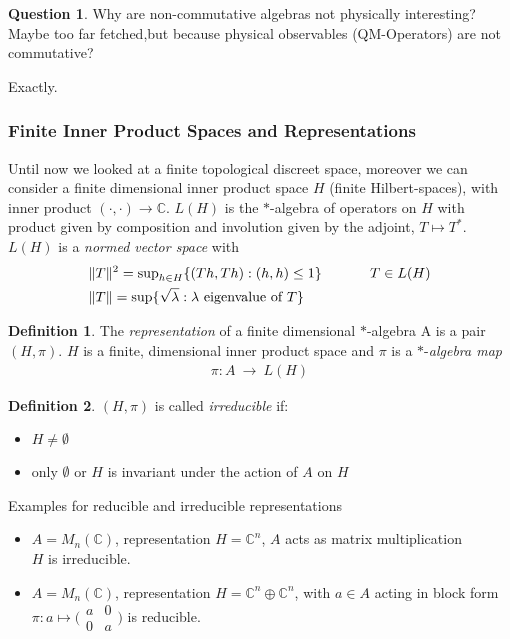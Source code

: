 \documentclass[a4paper]{article}
\theoremstyle{definition}
\newtheorem{definition}{Definition}
\theoremstyle{definition}
\newtheorem{question}{Question}
\theoremstyle{theorem}
\theoremstyle{theorem}
\theoremstyle{definition}
\begin{document}
\begin{question}
    Why are non-commutative algebras not physically interesting?
    Maybe too far fetched,but because physical observables (QM-Operators) are not commutative?
\end{question}
Exactly.

\subsubsection{Finite Inner Product Spaces and Representations}
Until now we looked at a finite topological discreet space, moreover we can consider a
finite dimensional inner product space $H$ (finite Hilbert-spaces), with inner product
$(\cdot,\cdot)\rightarrow \mathbb{C}$. $L(H)$ is the $*$-algebra of operators on $H$
with product given by composition and involution given by the adjoint, $T \mapsto T^*$.
$L(H)$ is a \textit{normed vector space} with
\begin{align*}
    &\|T\|^2 = \text{sup}_{h \in H}\{(Th,Th): (h,h) \leq 1\} \hspace{0.1\textwidth} T \in L(H) \\
    &\|T\| = \text{sup}\{\sqrt{\lambda}: \lambda \text{ eigenvalue of } T\}
\end{align*}


\begin{definition}
    The \textit{representation} of a finite dimensional $*$-algebra A is a pair $(H, \pi)$.
    $H$ is a finite, dimensional inner product space and $\pi$ is a $*$-\textit{algebra map}
    \begin{align*}
        \pi:A\ \rightarrow \ L(H)
    \end{align*}
\end{definition}
\begin{definition}
    $(H, \pi)$ is called \textit{irreducible} if:
    \begin{itemize}
        \item $H \neq \emptyset$
        \item only $\emptyset$ or $H$ is invariant under the action of $A$ on $H$
    \end{itemize}
\end{definition}

Examples for reducible and irreducible representations
\begin{itemize}
    \item $A = M_n(\mathbb{C})$, representation $H=\mathbb{C}^n$, $A$ acts as matrix multiplication\\
            $H$ is irreducible.
    \item $A = M_n(\mathbb{C})$, representation $H=\mathbb{C}^n\oplus \mathbb{C}^n$, with $a \in A$ acting
        in block form \\ $\pi: a \mapsto \big(\begin{smallmatrix} a & 0\\ 0 & a \end{smallmatrix}\big)$ is
            reducible.
\end{itemize}
\end{document}
